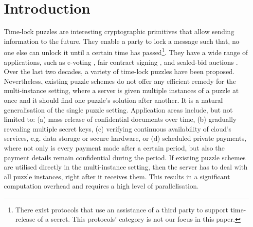 
\section{Introduction}


Time-lock puzzles are  interesting cryptographic primitives  that allow sending  information to the future. They enable  a party to lock a message such that,  no one else can unlock it until  a certain time has passed\footnote{ There exist protocols that use an assistance of a third party to support time-release of a secret.  This protocols' category is not our focus in this paper.}. They have a wide range of   applications, such as  e-voting \cite{ChenD12}, fair contract signing \cite{BonehN00},    and sealed-bid auctions \cite{Rivest:1996:TPT:888615}. Over the last two decades, a variety of time-lock puzzles have been proposed.  Nevertheless,  existing puzzle schemes  do not offer  any efficient remedy  for the multi-instance setting, where  a server is given multiple instances of a puzzle at once and it  should find one puzzle's solution after another.  It is a natural generalisation of the single puzzle setting. Application areas include, but not limited to:  (a) mass release of confidential documents  over time, (b) gradually revealing multiple secret keys, (c)    verifying continuous availability of cloud's services, e.g. data storage or secure hardware, or (d)  scheduled private payments, where  not only is every payment  made  after a certain  period, but also the payment details   remain confidential during the period. If  existing puzzle schemes are utilised directly in  the  multi-instance setting, then the server has to  deal with all puzzle instances, right after it receives them. This  results in a significant computation overhead and  requires a high level of parallelisation. %

